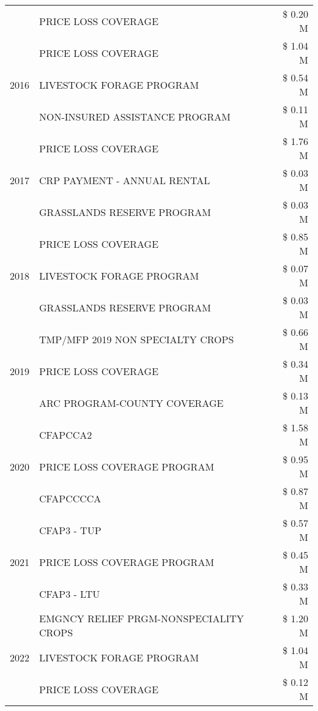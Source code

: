 \begin{tabular}{llr}
 & PRICE LOSS COVERAGE & \$ 0.20 M \\
\cline{1-3}
\multirow[t]{3}{*}{2016} & PRICE LOSS COVERAGE & \$ 1.04 M \\
 & LIVESTOCK FORAGE PROGRAM & \$ 0.54 M \\
 & NON-INSURED ASSISTANCE PROGRAM & \$ 0.11 M \\
\cline{1-3}
\multirow[t]{3}{*}{2017} & PRICE LOSS COVERAGE & \$ 1.76 M \\
 & CRP PAYMENT - ANNUAL RENTAL & \$ 0.03 M \\
 & GRASSLANDS RESERVE PROGRAM & \$ 0.03 M \\
\cline{1-3}
\multirow[t]{3}{*}{2018} & PRICE LOSS COVERAGE & \$ 0.85 M \\
 & LIVESTOCK FORAGE PROGRAM & \$ 0.07 M \\
 & GRASSLANDS RESERVE PROGRAM & \$ 0.03 M \\
\cline{1-3}
\multirow[t]{3}{*}{2019} & TMP/MFP 2019 NON SPECIALTY CROPS & \$ 0.66 M \\
 & PRICE LOSS COVERAGE & \$ 0.34 M \\
 & ARC PROGRAM-COUNTY COVERAGE & \$ 0.13 M \\
\cline{1-3}
\multirow[t]{3}{*}{2020} & CFAPCCA2 & \$ 1.58 M \\
 & PRICE LOSS COVERAGE PROGRAM & \$ 0.95 M \\
 & CFAPCCCCA & \$ 0.87 M \\
\cline{1-3}
\multirow[t]{3}{*}{2021} & CFAP3 - TUP & \$ 0.57 M \\
 & PRICE LOSS COVERAGE PROGRAM & \$ 0.45 M \\
 & CFAP3 - LTU & \$ 0.33 M \\
\cline{1-3}
\multirow[t]{3}{*}{2022} & EMGNCY RELIEF PRGM-NONSPECIALITY CROPS & \$ 1.20 M \\
 & LIVESTOCK FORAGE PROGRAM & \$ 1.04 M \\
 & PRICE LOSS COVERAGE & \$ 0.12 M \\
\cline{1-3}
\bottomrule
\end{tabular}

